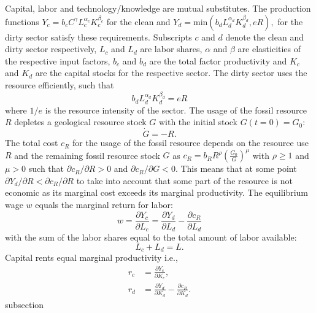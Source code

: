 Capital, labor and technology/knowledge are mutual substitutes. The production functions $Y_c = b_c C^{\gamma} L_c^{\alpha_c}K_c^{\beta_c}$  for the clean and 	$Y_d = \mathrm{ min}\left( b_d L_d^{\alpha_d}K_d^{\beta_d}, e R \right),$ for the dirty sector satisfy these requirements. Subscripts $c$ and $d$ denote the clean and dirty sector respectively, $L_c$ and $L_d$ are labor shares, $\alpha$ and $\beta$ are elasticities of the respective input factors, $b_c$ and $b_d$ are the total factor productivity and $K_c$ and $K_d$ are the capital stocks for the respective sector.
The dirty sector uses the resource efficiently, such that
\begin{equation}
    b_d L_d^{\alpha_d}K_d^{\beta_d} = e R
    \label{eq:approx_edr}
\end{equation}
where $1/e$ is the resource intensity of the sector. The usage of the fossil resource $R$ depletes a geological resource stock $G$ with the initial stock $G(t=0) = G_0$:
\begin{equation}
    \dot{G} = -R. 
    \label{eq:approx_rdep}
\end{equation} 
The total cost $c_R$ for the usage of the fossil resource depends on the resource use $R$ and the remaining fossil resource stock $G$ as $c_R = b_R R^{\rho}\left( \frac{G_0}{G} \right)^{\mu}$ with $\rho \geq 1$ and $\mu > 0$ such that $\partial c_R / \partial R >0$ and $\partial c_R / \partial G < 0$.
This means that at some point $\partial Y_d / \partial R < \partial c_R / \partial R$ to take into account that some part of the resource is not economic as its marginal cost exceeds its marginal productivity.
The equilibrium wage $w$ equals the marginal return for labor:
\begin{equation}
	w = \frac{\partial Y_c}{\partial L_c} = \frac{\partial Y_d}{\partial L_d} - \frac{\partial c_R}{\partial L_d}
	\label{eq:approx_equilibrium_wage}
\end{equation}
with the sum of the labor shares equal to the total amount of labor available:
\begin{equation}
	L_c + L_d = L.
	\label{eq:approx_L}
\end{equation}
Capital rents equal marginal productivity i.e., 
\begin{align}
  r_c &= \frac{\partial Y_c}{\partial K_c}, \label{eq:approx_ccr} \\
  r_d &= \frac{\partial Y_d}{\partial K_d} - \frac{\partial c_R}{\partial K_d}. \label{eq:approx_dcr}
\end{align}
subsection
